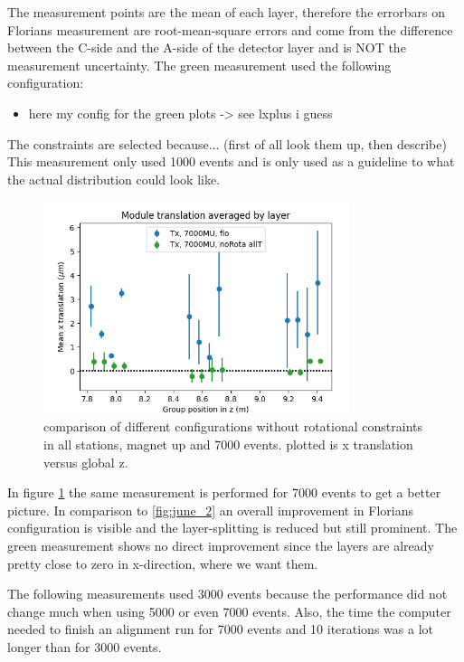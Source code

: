 The measurement points are the mean of each layer, therefore the errorbars on Florians measurement are root-mean-square errors and come from the difference between the C-side and the A-side of the detector layer and is NOT the measurement uncertainty.
The green measurement used the following configuration:
\begin{itemize}
  \item here my config for the green plots -> see lxplus i guess
\end{itemize}
The constraints are selected because... (first of all look them up, then describe)
This measurement only used 1000 events and is only used as a guideline to what the actual distribution could look like.

\begin{figure}
  \centering
  \includegraphics[width=0.8\textwidth]{plots/june_21/Tx_noRota_allT_7000MU.png}
  \caption{comparison of different configurations without rotational constraints in all stations, magnet up and 7000 events. plotted is x translation versus global z.}
  \label{fig:june_2_1}
\end{figure}

In figure \ref{fig:june_2_1} the same measurement is performed for 7000 events to get a better picture. In comparison to \ref{fig:june_2} an overall improvement in Florians configuration is visible and the layer-splitting is reduced but still prominent. The green measurement shows no direct improvement since the layers are already pretty close to zero in x-direction, where we want them.

The following measurements used 3000 events because the performance did not change much when using 5000 or even 7000 events. Also, the time the computer needed to finish an alignment run for 7000 events and 10 iterations was a lot longer than for 3000 events.

